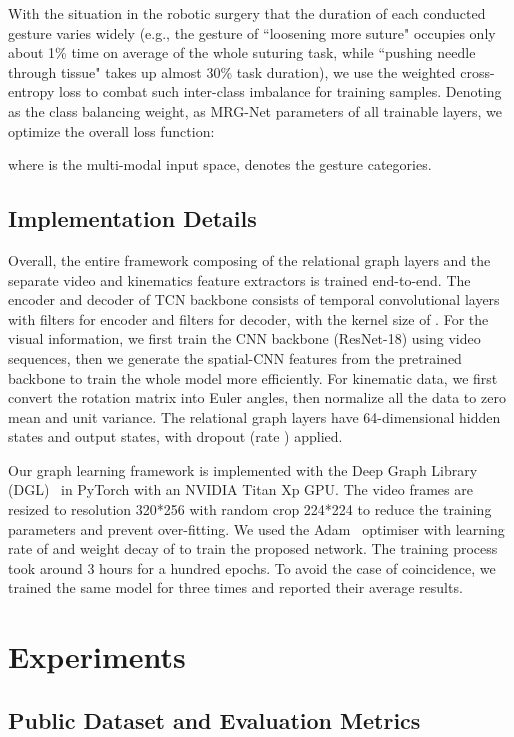 \documentclass[letterpaper, 10 pt, conference]{ieeeconf}
\begin{document}
With the situation in the robotic surgery that the duration of each conducted gesture varies widely (e.g., the gesture of ``loosening more suture" occupies only about 1\% time on average of the whole suturing task, while ``pushing needle through tissue" takes up almost 30\% task duration), we use the weighted cross-entropy loss to combat such inter-class imbalance for training samples.
Denoting  as the class balancing weight,  as MRG-Net parameters of all trainable layers, we optimize the overall loss function:

where  is the multi-modal input space,  denotes the gesture categories.

\subsection{Implementation Details}
Overall, the entire framework composing of the relational graph layers and the separate video and kinematics feature extractors is trained end-to-end.
The encoder and decoder of TCN backbone consists of  temporal convolutional layers with  filters for encoder and  filters for decoder, with the kernel size of .
For the visual information, we first train the CNN backbone (ResNet-18) using video sequences, then we generate the spatial-CNN features  from the pretrained backbone to train the whole model more efficiently. For kinematic data, we first convert the rotation matrix
into Euler angles,
then normalize all the data to zero mean and unit variance. The relational graph layers have 64-dimensional hidden states and output states, with dropout (rate ) applied.

Our graph learning framework is implemented with the Deep Graph Library (DGL)~\cite{wang2019dgl} in PyTorch with an NVIDIA Titan Xp GPU. The video frames are resized to resolution 320*256 with random crop 224*224 to reduce the training parameters and prevent over-fitting.
We used the Adam~\cite{kingma2014adam} optimiser with learning rate of  and weight decay of  to train the proposed network. The training process took around 3 hours for a hundred epochs.
To avoid the case of coincidence, we trained the same model for three times and reported their average results.


\section{Experiments}

\subsection{Public Dataset and Evaluation Metrics}
\end{document}

